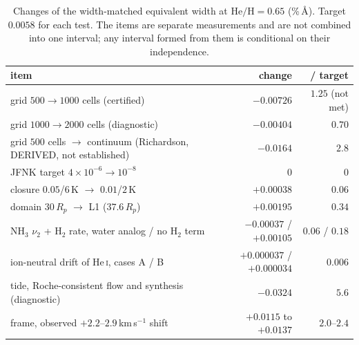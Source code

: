 \documentclass[english,a4paper]{my_memo}
\begin{document}
\begin{table}[htbp]\centering\small
\caption{Changes of the width-matched equivalent width at
$\mathrm{He/H} = 0.65$ (\%\,\AA). Target $0.0058$ for each test. The items
are separate measurements and are not combined into one interval; any
interval formed from them is conditional on their independence.}
\label{tab:oct_budget}
\begin{tabular}{lrr}
\toprule
item & change & / target \\
\midrule
grid $500 \to 1000$ cells (certified) & $-0.00726$ & $1.25$ (not met) \\
grid $1000 \to 2000$ cells (diagnostic) & $-0.00404$ & $0.70$ \\
grid $500$ cells $\to$ continuum (Richardson, DERIVED, not established) & $-0.0164$ & $2.8$ \\
JFNK target $4\times10^{-6} \to 10^{-8}$ & $0$ & $0$ \\
closure $0.05$/$6$\,K $\to$ $0.01$/$2$\,K & $+0.00038$ & $0.06$ \\
domain $30\,R_p$ $\to$ L1 ($37.6\,R_p$) & $+0.00195$ & $0.34$ \\
NH$_3$ $\nu_2$ + H$_2$ rate, water analog / no H$_2$ term & $-0.00037$ / $+0.00105$ & $0.06$ / $0.18$ \\
ion-neutral drift of He\,\textsc{i}, cases A / B & $+0.000037$ / $+0.000034$ & $0.006$ \\
tide, Roche-consistent flow and synthesis (diagnostic) & $-0.0324$ & $5.6$ \\
frame, observed $+2.2$--$2.9$\,km\,s$^{-1}$ shift & $+0.0115$ to $+0.0137$ & $2.0$--$2.4$ \\
\bottomrule
\end{tabular}
\end{table}
\end{document}
